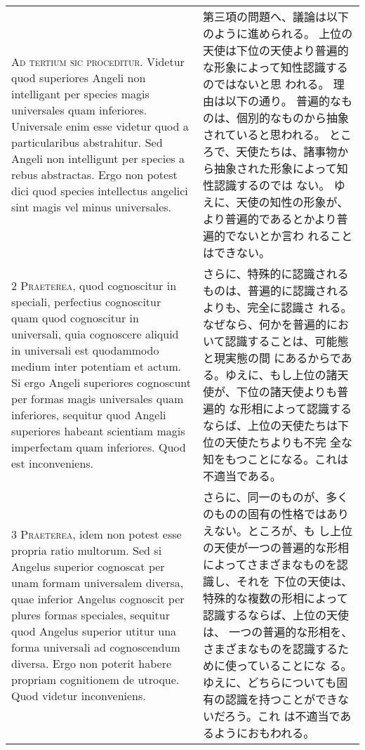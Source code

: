 \documentclass[10pt]{jsarticle} %
\begin{document}
\begin{longtable}{p{21em}p{21em}}

{\huge A}{\scshape d tertium sic proceditur}. Videtur quod superiores
 Angeli non intelligant per species magis universales quam
 inferiores. Universale enim esse videtur quod a particularibus
 abstrahitur. Sed Angeli non intelligunt per species a rebus
 abstractas. Ergo non potest dici quod species intellectus angelici sint
 magis vel minus universales.


&


第三項の問題へ、議論は以下のように進められる。
上位の天使は下位の天使より普遍的な形象によって知性認識するのではないと思
 われる。
理由は以下の通り。
普遍的なものは、個別的なものから抽象されていると思われる。
ところで、天使たちは、諸事物から抽象された形象によって知性認識するのでは
 ない。
ゆえに、天使の知性の形象が、より普遍的であるとかより普遍的でないとか言わ
 れることはできない。

\\


{\scshape 2 Praeterea}, quod cognoscitur in speciali,
perfectius cognoscitur quam quod cognoscitur in universali, quia
cognoscere aliquid in universali est quodammodo medium inter potentiam
et actum. Si ergo Angeli superiores cognoscunt per formas magis
universales quam inferiores, sequitur quod Angeli superiores habeant
scientiam magis imperfectam quam inferiores. Quod est inconveniens.


&


さらに、特殊的に認識されるものは、普遍的に認識されるよりも、完全に認識さ
 れる。なぜなら、何かを普遍的において認識することは、可能態と現実態の間
 にあるからである。ゆえに、もし上位の諸天使が、下位の諸天使よりも普遍的
 な形相によって認識するならば、上位の天使たちは下位の天使たちよりも不完
 全な知をもつことになる。これは不適当である。

\\


{\scshape 3 Praeterea}, idem non potest esse propria
ratio multorum. Sed si Angelus superior cognoscat per unam formam
universalem diversa, quae inferior Angelus cognoscit per plures formas
speciales, sequitur quod Angelus superior utitur una forma universali ad
cognoscendum diversa. Ergo non poterit habere propriam cognitionem de
utroque. Quod videtur inconveniens.


&


さらに、同一のものが、多くのものの固有の性格ではありえない。ところが、も
 し上位の天使が一つの普遍的な形相によってさまざまなものを認識し、それを
 下位の天使は、特殊的な複数の形相によって認識するならば、上位の天使は、
 一つの普遍的な形相を、さまざまなものを認識するために使っていることにな
 る。ゆえに、どちらについても固有の認識を持つことができないだろう。これ
 は不適当であるようにおもわれる。


\end{longtable}
\end{document}
